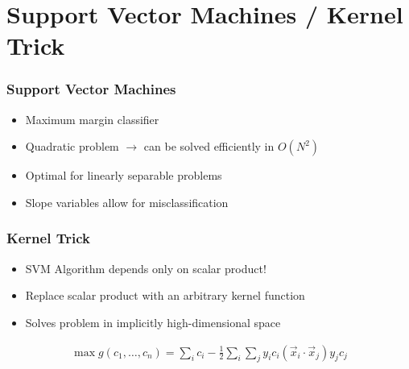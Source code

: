 \section[svm]{Support Vector Machines / Kernel Trick}

\begin{frame}
    \frametitle{Support Vector Machines}
    \begin{center}
        \begin{itemize}
            \item Maximum margin classifier
            \item Quadratic problem $\rightarrow$ can be solved efficiently in $O(N^2)$
            \item Optimal for linearly separable problems
            \item Slope variables allow for misclassification
        \end{itemize}

    \end{center}
\end{frame}

\begin{frame}
    \frametitle{Kernel Trick}
    \begin{center}
        \begin{itemize}
            \item SVM Algorithm depends only on scalar product!
            \item Replace scalar product with an arbitrary kernel function
            \item Solves problem in implicitly high-dimensional space
        \end{itemize}
        \begin{align*}
            \max g(c_1, \dots, c_n) = \sum_i c_i - \frac{1}{2} \sum_i \sum_j y_i c_i (\vec{x}_i \cdot \vec{x}_j) y_j c_j
        \end{align*}
    \end{center}
\end{frame}

